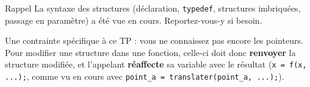 \begin{UPSTIinfor}{Rappel}
  La syntaxe des structures (déclaration, \texttt{typedef}, structures imbriquées, passage en
  paramètre) a été vue en cours. Reportez-vous-y si besoin.

  Une contrainte spécifique à ce TP : vous ne connaissez pas encore les pointeurs. Pour modifier
  une structure dans une fonction, celle-ci doit donc \textbf{renvoyer} la structure modifiée, et
  l'appelant \textbf{réaffecte} sa variable avec le résultat (\texttt{x = f(x, ...);}, comme vu en
  cours avec \texttt{point\_a = translater(point\_a, ...);}).
\end{UPSTIinfor}

\pagebreak

